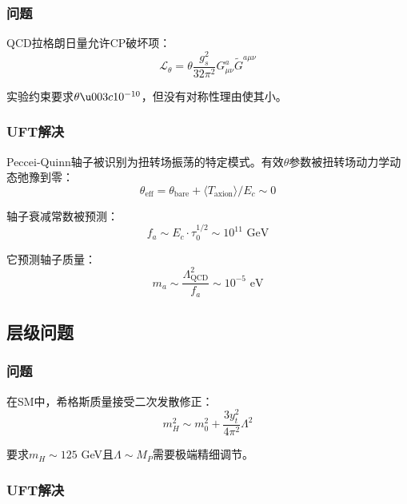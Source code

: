 \subsubsection{问题}

QCD拉格朗日量允许CP破坏项：
\begin{equation}
    \mathcal{L}_{\theta} = \theta \frac{g_s^2}{32\pi^2} G_{\mu\nu}^a \tilde{G}^{a\mu\nu}
\end{equation}

实验约束要求$\theta \u003c 10^{-10}$，但没有对称性理由使其小。

\subsubsection{UFT解决}

\begin{insight}[轴子作为扭转模式]
Peccei-Quinn轴子被识别为扭转场振荡的特定模式。有效$\theta$参数被扭转场动力学动态弛豫到零：
\begin{equation}
    \theta_{\text{eff}} = \theta_{\text{bare}} + \langle T_{\text{axion}} \rangle/E_c \sim 0
\end{equation}
\end{insight}

轴子衰减常数被预测：
\begin{equation}
    f_a \sim E_c \cdot \tau_0^{1/2} \sim 10^{11} \text{ GeV}
\end{equation}

它预测轴子质量：
\begin{equation}
    m_a \sim \frac{\Lambda_{\text{QCD}}^2}{f_a} \sim 10^{-5} \text{ eV}
\end{equation}

\subsection{层级问题}

\subsubsection{问题}

在SM中，希格斯质量接受二次发散修正：
\begin{equation}
    m_H^2 \sim m_0^2 + \frac{3y_t^2}{4\pi^2} \Lambda^2
\end{equation}

要求$m_H \sim 125$ GeV且$\Lambda \sim M_P$需要极端精细调节。

\subsubsection{UFT解决}

